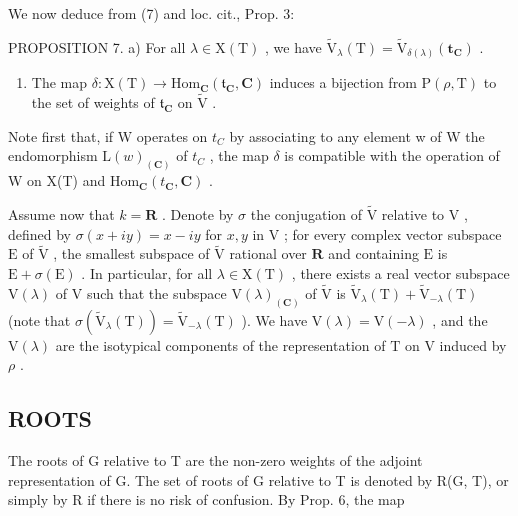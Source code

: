 We now deduce from (7) and loc. cit., Prop. 3:

PROPOSITION 7. a) For all \(\lambda \in \mathrm{X(T)}\) , we have \(\tilde{\mathrm{V}}_{\lambda}(\mathrm{T}) = \tilde{\mathrm{V}}_{\delta (\lambda)}(\mathbf{t}_{\mathbf{C}})\) .

\begin{enumerate}
\def\labelenumi{\alph{enumi})}
\setcounter{enumi}{1}
\tightlist
\item
  The map \(\delta : \mathrm{X(T)} \to \mathrm{Hom}_{\mathbf{C}}(\mathfrak{t}_{\mathbf{C}}, \mathbf{C})\) induces a bijection from \(\mathrm{P}(\rho, \mathrm{T})\) to the set of weights of \(\mathfrak{t}_{\mathbf{C}}\) on \(\tilde{\mathrm{V}}\) .
\end{enumerate}

Note first that, if W operates on \(t_{C}\) by associating to any element w of W the endomorphism \(\mathrm{L}(w)_{(\mathbf{C})}\) of \(t_{C}\) , the map \(\delta\) is compatible with the operation of W on X(T) and \(\mathrm{Hom}_{\mathbf{C}}(t_{\mathbf{C}}, \mathbf{C})\) .

Assume now that \(k = \mathbf{R}\) . Denote by \(\sigma\) the conjugation of \(\tilde{\mathrm{V}}\) relative to \(\mathrm{V}\) , defined by \(\sigma(x + iy) = x - iy\) for \(x, y\) in \(\mathrm{V}\) ; for every complex vector subspace \(\mathrm{E}\) of \(\tilde{\mathrm{V}}\) , the smallest subspace of \(\tilde{\mathrm{V}}\) rational over \(\mathbf{R}\) and containing \(\mathrm{E}\) is \(\mathrm{E} + \sigma(\mathrm{E})\) . In particular, for all \(\lambda \in \mathrm{X}(\mathrm{T})\) , there exists a real vector subspace \(\mathrm{V}(\lambda)\) of \(\mathrm{V}\) such that the subspace \(\mathrm{V}(\lambda)_{(\mathbf{C})}\) of \(\tilde{\mathrm{V}}\) is \(\tilde{\mathrm{V}}_{\lambda}(\mathrm{T}) + \tilde{\mathrm{V}}_{-\lambda}(\mathrm{T})\) (note that \(\sigma(\tilde{\mathrm{V}}_{\lambda}(\mathrm{T})) = \tilde{\mathrm{V}}_{-\lambda}(\mathrm{T})\) ). We have \(\mathrm{V}(\lambda) = \mathrm{V}(-\lambda)\) , and the \(\mathrm{V}(\lambda)\) are the isotypical components of the representation of \(\mathrm{T}\) on \(\mathrm{V}\) induced by \(\rho\) .

\subsection{ROOTS}

The roots of G relative to T are the non-zero weights of the adjoint representation of G. The set of roots of G relative to T is denoted by R(G, T), or simply by R if there is no risk of confusion. By Prop. 6, the map

